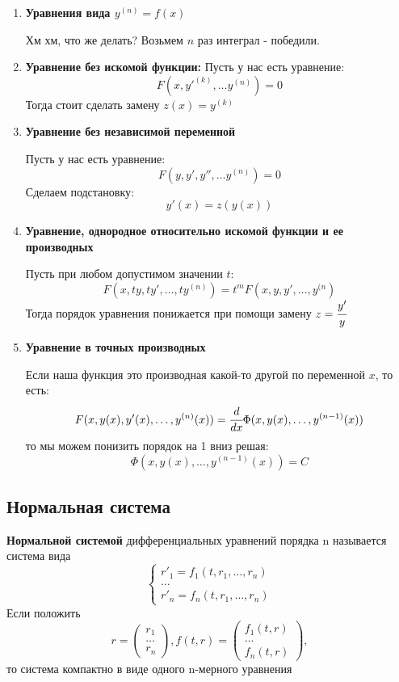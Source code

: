 \begin{enumerate}
    \item \textbf{Уравнения вида $y^{(n)} = f(x)$}
    
Хм хм, что же делать? Возьмем $n$ раз интеграл - победили.
    \item  \textbf{Уравнение без искомой функции:}
    Пусть у нас есть уравнение:
    $$F(x,y'^{(k)},\ldots y^{(n)}) = 0$$
    Тогда стоит сделать замену $z(x) = y^{(k)}$

    \item \textbf{Уравнение без независимой переменной}

    Пусть у нас есть уравнение:
    $$F(y,y',y'',\ldots y^{(n)}) = 0$$
    Сделаем подстановку:
    $$y'(x) = z(y(x))$$

    \item \textbf{Уравнение, однородное относительно искомой функции и ее производных}

    Пусть при любом допустимом значении $t$:
    $$F(x,ty,ty', \ldots, ty^{(n)}) = t^m F(x,y,y', \ldots, y^{(n})$$
    Тогда порядок уравнения понижается при помощи замену $z = \cfrac{y'}{y}$
    \item  \textbf{Уравнение в точных производных}

    Если наша функция это производная какой-то другой по переменной $x$, то есть:
    $$F(x,y(x),y'(x), \ldots, y^{(n)}(x)) = \cfrac{d}{dx} \Phi(x,y(x),\ldots , y^{(n-1)}(x))$$
    то мы можем понизить порядок на 1 вниз решая:
    $$\Phi(x,y(x),\ldots , y^{(n-1)}(x)) = C$$
\end{enumerate}





\subsection{Нормальная система}

  \textbf{Нормальной системой} дифференциальных уравнений  порядка n называется система вида\
$$\begin{cases}
r'_1  = f_1 (t, r_1, \dots, r_n) \\
\dots \\
r'_n   =   f_n(t, r_1, \dots, r_n)
\end{cases}$$
Если положить 
$$   r =
\begin{pmatrix}
r_1  \\
\dots \\
r_n
\end{pmatrix}, f(t,r) = 
\begin{pmatrix}
f_1 (t,r)  \\
\dots   \\
f_n(t,r)
\end{pmatrix},
$$   %
то система компактно в виде одного n-мерного уравнения

